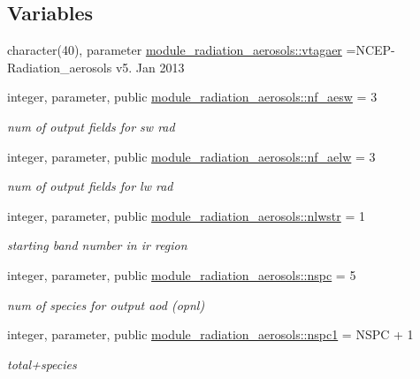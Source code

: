 \subsection*{Variables}
\begin{DoxyCompactItemize}
\item 
character(40), parameter \hyperlink{namespacemodule__radiation__aerosols_a6d0e0cbcb4a13c1f80f6b1c41b13d3b8}{module\+\_\+radiation\+\_\+aerosols\+::vtagaer} =\textquotesingle{}N\+C\+EP-\/Radiation\+\_\+aerosols v5. Jan 2013 \textquotesingle{}
\item 
integer, parameter, public \hyperlink{group__module__radiation__aerosols_gae0d9615fa694e2a5dfe8fb48e99b7e76}{module\+\_\+radiation\+\_\+aerosols\+::nf\+\_\+aesw} = 3
\begin{DoxyCompactList}\small\item\em num of output fields for sw rad \end{DoxyCompactList}\item 
integer, parameter, public \hyperlink{group__module__radiation__aerosols_gafba0069cd611248a9595a126a13f5203}{module\+\_\+radiation\+\_\+aerosols\+::nf\+\_\+aelw} = 3
\begin{DoxyCompactList}\small\item\em num of output fields for lw rad \end{DoxyCompactList}\item 
integer, parameter, public \hyperlink{group__module__radiation__aerosols_ga654ab60d433133542d3c07edd2244566}{module\+\_\+radiation\+\_\+aerosols\+::nlwstr} = 1
\begin{DoxyCompactList}\small\item\em starting band number in ir region \end{DoxyCompactList}\item 
integer, parameter, public \hyperlink{group__module__radiation__aerosols_ga3d126c465af80bb698d9d1a288c181bb}{module\+\_\+radiation\+\_\+aerosols\+::nspc} = 5
\begin{DoxyCompactList}\small\item\em num of species for output aod (opnl) \end{DoxyCompactList}\item 
integer, parameter, public \hyperlink{group__module__radiation__aerosols_ga476c0181513603112dec3f4d2a2ec839}{module\+\_\+radiation\+\_\+aerosols\+::nspc1} = N\+S\+PC + 1
\begin{DoxyCompactList}\small\item\em total+species \end{DoxyCompactList}\item 

\end{DoxyCompactItemize}
